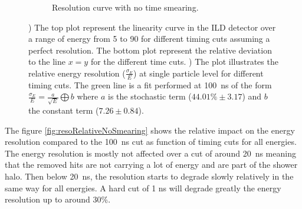 \begin{figure}[t]
  \hfill
  \begin{subfigure}[t]{0.45\textwidth}
    \centering
    \caption{Resolution curve with no time smearing.} \label{fig:resoNoSmearing}
  \end{subfigure}
  \caption{) The top plot represent the linearity curve in the ILD detector over a range of energy from 5 \GeV to 90 \GeV for different timing cuts assuming a perfect resolution. The bottom plot represent the relative deviation to the line $x=y$ for the different time cuts. ) The plot illustrates the relative energy resolution ($\frac{\sigma_{E}}{E}$) at single particle level for different timing cuts. The green line is a fit performed at \SI{100}{\nano\second} of the form $\frac{\sigma_{E}}{E} = \frac{a}{\sqrt{E}} \bigoplus b$ where $a$ is the stochastic term ($44.01\% \pm 3.17$) and $b$ the constant term ($7.26 \pm 0.84$).}
\end{figure}

The figure \ref{fig:resoRelativeNoSmearing} shows the relative impact on the energy resolution compared to the \SI{100}{\nano\second} cut as function of timing cuts for all energies. The energy resolution is mostly not affected over a cut of around \SI{20}{\nano\second} meaning that the removed hits are not carrying a lot of energy and are part of the shower halo. Then below \SI{20}{\nano\second}, the resolution starts to degrade slowly relatively in the same way for all energies. A hard cut of 1 ns will degrade greatly the energy resolution up to around 30\%.


